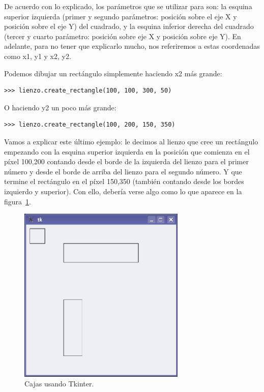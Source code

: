 De acuerdo con lo explicado, los parámetros que se utilizar para  son: la esquina superior izquierda (primer y segundo parámetros: posición sobre el eje X y posición sobre el eje Y) del cuadrado, y la esquina inferior derecha del cuadrado (tercer y cuarto parámetro: posición sobre eje X y posición sobre eje Y). En adelante, para no tener que explicarlo mucho, nos referiremos a estas coordenadas como x1, y1 y x2, y2. 

Podemos dibujar un rectángulo simplemente haciendo x2 más grande:

\begin{listing}
\begin{verbatim}
>>> lienzo.create_rectangle(100, 100, 300, 50)
\end{verbatim}
\end{listing}

\noindent
O haciendo y2 un poco más grande:

\begin{listing}
\begin{verbatim}
>>> lienzo.create_rectangle(100, 200, 150, 350)
\end{verbatim}
\end{listing}

Vamos a explicar este último ejemplo: le decimos al lienzo que cree un rectángulo empezando con la esquina superior izquierda en la posición que comienza en el píxel 100,200 contando desde el borde de la izquierda del lienzo para el primer número y desde el borde de arriba del lienzo para el segundo número. Y que termine el rectángulo en el píxel 150,350 (también contando desde los bordes izquierdo y superior).  Con ello, debería verse algo como lo que aparece en la figura~\ref{fig33}.

\begin{figure}
\begin{center}
\includegraphics[width=80mm]{figure33.eps}
\end{center}
\caption{Cajas usando Tkinter.}\label{fig33}
\end{figure}

